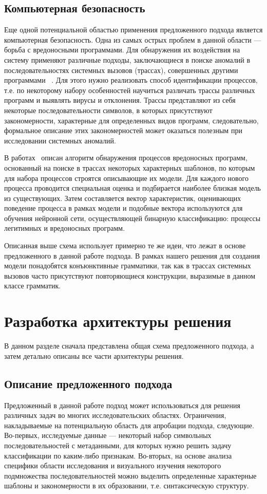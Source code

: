 \documentclass[14pt]{matmex-diploma-custom}
\begin{document}
\subsection{Компьютерная безопасность}
Еще одной потенциальной областью применения предложенного подхода является компьютерная безопасность. Одна из самых острых проблем в данной области --- борьба с вредоносными программами. Для обнаружения их воздействия на систему применяют различные подходы, заключающиеся в поиске аномалий в последовательностях системных вызовов (трассах), совершенных другими программами ~\cite{hofmeyr1998intrusion,wespi2000intrusion,ghosh1999study}. Для этого нужно реализовать способ идентификации процессов, т.е. по некоторому набору особенностей научиться различать трассы различных программ и выявлять вирусы и отклонения. Трассы представляют из себя некоторые последовательности символов, в которых присутствуют закономерности, характерные для определенных видов программ, следовательно, формальное описание этих закономерностей может оказаться полезным при исследовании системных аномалий.

В работах~\cite{баклановский2015поведенческая,баклановский2016оценка} описан алгоритм обнаружения процессов вредоносных программ, основанный на поиске в трассах некоторых характерных шаблонов, по которым для набора процессов строятся описывающие их модели. Для каждого нового процесса проводится специальная оценка и подбирается наиболее близкая модель из существующих. Затем составляется вектор характеристик, оценивающих поведение процесса в рамках модели и подобные вектора используются для обучения нейронной сети, осуществляющей бинарную классификацию: процессы легитимных и вредоносных программ.

Описанная выше схема использует примерно те же идеи, что лежат в основе предложенного в данной работе подхода. В рамках нашего решения для создания модели понадобятся конъюнктивные грамматики, так как в трассах системных вызовов часто присутствуют повторяющиеся конструкции, выразимые в данном классе грамматик.

\section{Разработка архитектуры решения}
В данном разделе сначала представлена общая схема предложенного подхода, а затем детально описаны все части архитектуры решения. 
\subsection{Описание предложенного подхода}
Предложенный в данной работе подход может использоваться для решения различных задач во многих исследовательских областях. Ограничения, накладываемые на потенциальную область для апробации подхода, следующие. Во-первых, исследуемые данные --- некоторый набор символьных последовательностей с метаданными, для которых нужно решить задачу классификации по каким-либо признакам. Во-вторых, на основе анализа специфики области исследования и визуального изучения некоторого подмножества последовательностей можно выделить определенные характерные шаблоны и закономерности в их образовании, т.е. синтаксическую структуру. 
\end{document}

